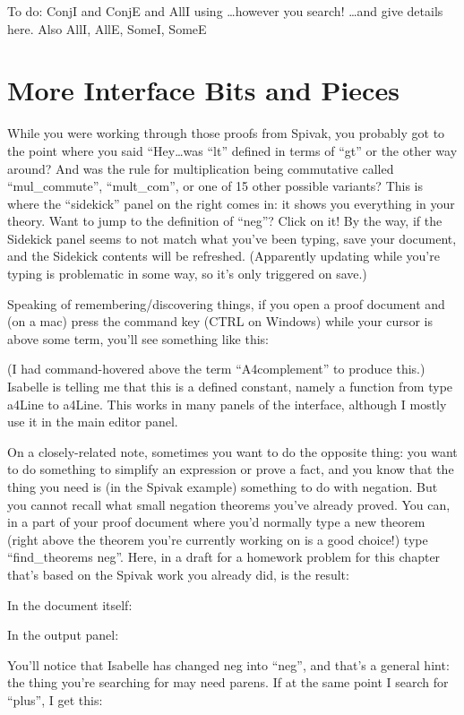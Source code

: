 To do: ConjI and ConjE and AllI using \ldots however you search! \ldots  and give details here. Also AllI, AllE, SomeI, SomeE

\section{More Interface Bits and Pieces}

While you were working through those proofs from Spivak, you probably got to the point where you said ``Hey\ldots was ``lt'' defined in terms of ``gt'' or the other way around? And was the rule for multiplication being commutative called ``mul_commute'', ``mult_com'', or one of 15 other possible variants? This is where the ``sidekick'' panel on the right comes in: it shows you everything in your theory. Want to jump to the definition of ``neg''? Click on it! By the way, if the Sidekick panel seems to not match what you've been typing, save your document, and the Sidekick contents will be refreshed. (Apparently updating while you're typing is problematic in some way, so it's only triggered on save.)

Speaking of remembering/discovering things, if you open a proof document and (on a mac) press the command key (CTRL on Windows) while your cursor is above some term, you'll see something like this:



(I had command-hovered above the term ``A4complement'' to produce this.) Isabelle is telling me that this is a defined constant, namely a function from type a4Line to a4Line. This works in many panels of the interface, although I mostly use it in the main editor panel. 

On a closely-related note, sometimes you want to do the opposite thing: you want to do something to simplify an expression or prove a fact, and you know that the thing you need is (in the Spivak example) something to do with negation. But you cannot recall what small negation theorems you've already proved. You can, in a part of your proof document where you'd normally type a new theorem (right above the theorem you're currently working on is a good choice!) type ``find_theorems neg''. Here, in a draft for a homework problem for this chapter that's based on the Spivak work you already did, is the result:

In the document itself:

In the output panel:
 

You'll notice that Isabelle has changed neg into ``neg'', and that's a general hint: the thing you're searching for may need parens. If at the same point I search for ``plus'', I get this:

